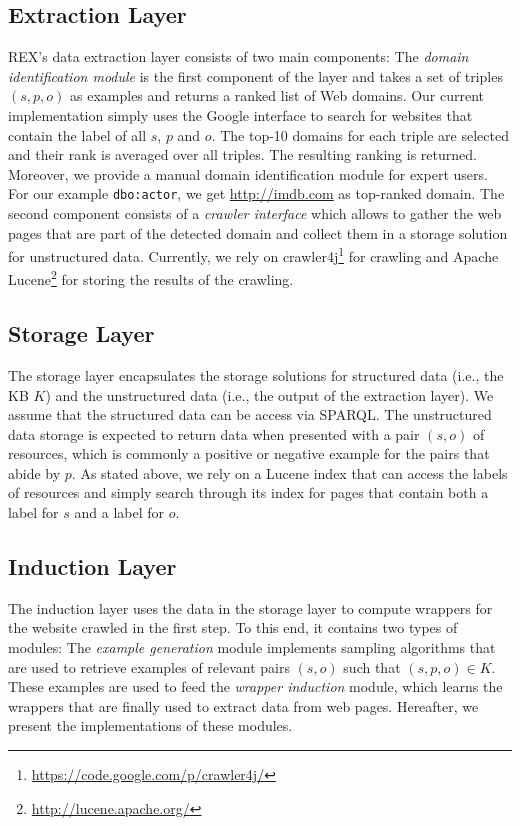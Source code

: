 \subsection{Extraction Layer}
REX's data extraction layer consists of two main components:
The \emph{domain identification module} is the first component of the layer and takes a set of triples $(s, p, o)$ as examples and returns a ranked list of Web domains.
Our current implementation simply uses the Google interface to search for websites that contain the label of all $s$, $p$ and $o$.
The top-10 domains for each triple are selected and their rank is averaged over all triples.
The resulting ranking is returned. 
Moreover, we provide a manual domain identification module for expert users.
For our example \texttt{dbo:actor}, we get \url{http://imdb.com} as top-ranked domain.
The second component consists of a \emph{crawler interface} which allows to gather the web pages that are part of the detected domain and collect them in a storage solution for unstructured data.
Currently, we rely on crawler4j\footnote{\url{https://code.google.com/p/crawler4j/}} for crawling and Apache Lucene\footnote{\url{http://lucene.apache.org/}} for storing the results of the crawling.  

\subsection{Storage Layer}
The storage layer encapsulates the storage solutions for structured data (i.e., the  \ac{KB} $K$) and the unstructured data (i.e., the output of the extraction layer). 
We assume that the structured data can be access via SPARQL.
The unstructured data storage is expected to return data when presented with a pair $(s, o)$ of resources, which is commonly a positive or negative example for the pairs that abide by $p$.
As stated above, we rely on a Lucene index that can access the labels of resources and simply search through its index for pages that contain both a label for $s$ and a label for $o$.

\subsection{Induction Layer}
The induction layer uses the data in the storage layer to compute wrappers for the website crawled in the first step.
To this end, it contains two types of modules:
The \emph{example generation} module implements sampling algorithms that are used to retrieve examples of relevant pairs $(s, o)$ such that $(s, p, o) \in K$. 
These examples are used to feed the \emph{wrapper induction} module, which learns the wrappers that are finally used to extract data from web pages.
Hereafter, we present the implementations of these modules.

